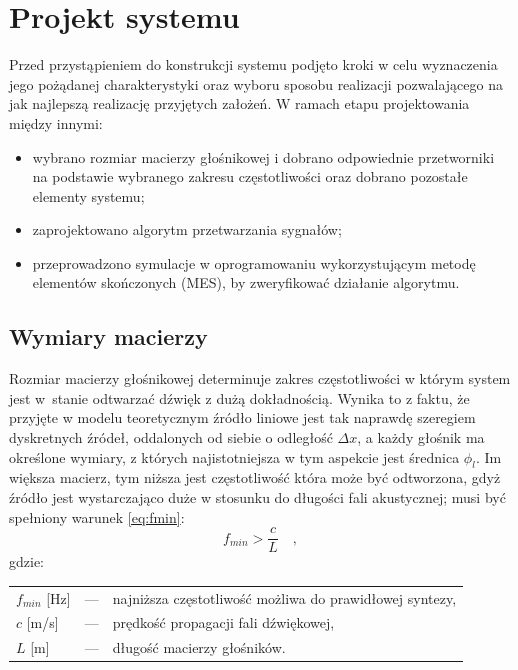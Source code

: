 \documentclass[12pt]{oska}
\let\Oldsection\section
\renewcommand{\section}{\FloatBarrier\Oldsection}
\let\Oldsubsection\subsection
\renewcommand{\subsection}{\FloatBarrier\Oldsubsection}
\begin{document}
\section{Projekt systemu}

Przed przystąpieniem do konstrukcji systemu podjęto kroki w celu wyznaczenia
jego pożądanej charakterystyki oraz wyboru sposobu realizacji pozwalającego na
jak najlepszą realizację przyjętych założeń. W ramach etapu projektowania
między innymi:
\begin{itemize}
  \item wybrano rozmiar macierzy głośnikowej i dobrano odpowiednie przetworniki
    na podstawie wybranego zakresu częstotliwości oraz dobrano pozostałe elementy systemu;
  \item zaprojektowano algorytm przetwarzania sygnałów;
  \item przeprowadzono symulacje w oprogramowaniu wykorzystującym metodę
    elementów skończonych (MES), by zweryfikować działanie algorytmu.
\end{itemize}

\subsection{Wymiary macierzy}

Rozmiar macierzy głośnikowej determinuje zakres częstotliwości w którym system
jest w~stanie odtwarzać dźwięk z dużą dokładnością. Wynika to z faktu, że
przyjęte w modelu teoretycznym źródło liniowe jest tak naprawdę szeregiem
dyskretnych źródeł, oddalonych od siebie o odległość $\Delta x$, a każdy
głośnik ma określone wymiary, z których najistotniejsza w tym aspekcie jest
średnica $\phi_l$. Im większa macierz, tym niższa jest częstotliwość która może
być odtworzona, gdyż źródło jest wystarczająco duże w stosunku do długości fali
akustycznej; musi być spełniony warunek \eqref{eq:fmin}:
\begin{equation}
  f_{min}>\frac{c}{L} \quad,	\label{eq:fmin}
\end{equation}
gdzie:\\
\indent \begin{tabular}{l c l}
  $f_{min}$ [\si{\hertz}] & --- & najniższa częstotliwość możliwa do prawidłowej syntezy, \\
  $c$ [\si[per-mode=symbol]{\metre\per\second}] & --- & prędkość propagacji fali dźwiękowej, \\
  $L$ [\si{\metre}] & --- & długość macierzy głośników. \\
\end{tabular}\\
\end{document}

